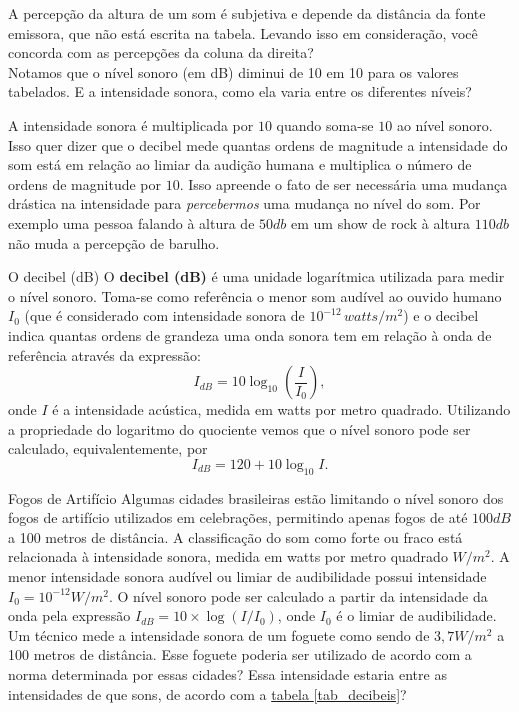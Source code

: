 \begin{reflection}
A percepção da altura de um som é subjetiva e depende da distância da fonte emissora, que não está escrita na tabela. Levando isso em consideração, você concorda com as percepções da coluna da direita?\\
Notamos que o nível sonoro (em dB) diminui de 10 em 10 para os valores tabelados. E a intensidade sonora, como ela varia entre os diferentes níveis? 
\end{reflection}

A intensidade sonora é multiplicada por $10$ quando soma-se $10$ ao nível sonoro. Isso quer dizer que o decibel mede quantas ordens de magnitude a intensidade do som está em relação ao limiar da audição humana e multiplica o número de ordens de magnitude por $10$. Isso apreende o fato de ser necessária uma mudança drástica na intensidade para \textit{percebermos}  uma mudança no nível do som. Por exemplo uma pessoa falando à altura de $50db$ em um show de rock à altura $110db$ não muda a percepção de barulho.

\begin{observationtitle}{O decibel (dB)}
O \textbf{decibel (dB)} é uma unidade logarítmica utilizada para medir o nível sonoro. Toma-se como referência o menor som audível ao ouvido humano $I_0$ (que é considerado com intensidade sonora de $10^{-12}\, watts/m^2$) e o decibel indica quantas ordens de grandeza uma onda sonora tem em relação à onda de referência através da expressão:
$$
I_{dB} = 10 \log_{10} \left(\frac{I}{I_0}\right),
$$
onde $I$ é a intensidade acústica, medida em watts por metro quadrado. Utilizando a propriedade do logaritmo do quociente vemos que o nível sonoro pode ser calculado, equivalentemente, por
$$
I_{dB} = 120 + 10 \log_{10} I.
$$
\end{observationtitle}


\begin{task}{Fogos de Artifício}
Algumas cidades brasileiras estão limitando o nível sonoro dos fogos de artifício utilizados em celebrações, permitindo apenas fogos de até $100dB$ a 100 metros de distância. A classificação do som como forte ou fraco está relacionada à intensidade sonora, medida em watts por metro quadrado $W/m^2$. A menor intensidade sonora audível ou limiar de audibilidade possui intensidade $I_0 = 10^{-12} W/m^2$. O nível sonoro pode ser calculado a partir da intensidade da onda pela expressão $I_{dB} = 10 \times \log(I/I_0)$, onde $I_0$ é o limiar de audibilidade. Um técnico mede a intensidade sonora de um foguete como sendo de $3{,}7 W/m^2$ a 100 metros de distância. Esse foguete poderia ser utilizado de acordo com a norma determinada por essas cidades? Essa intensidade estaria entre as intensidades de que sons, de acordo com a \hyperref[tab_decibeis]{tabela \ref{tab_decibeis}}?
\end{task}



